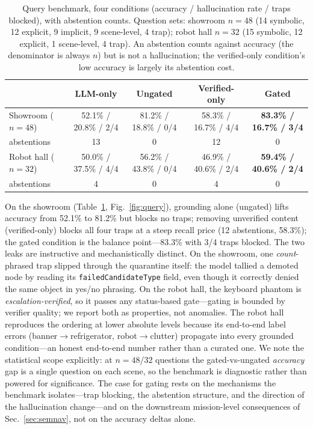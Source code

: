 \begin{table}[t]
\centering
\caption{Query benchmark, four conditions (accuracy / hallucination rate /
traps blocked), with abstention counts. Question sets: showroom $n{=}48$
(14 symbolic, 12 explicit, 9 implicit, 9 scene-level, 4 trap); robot hall
$n{=}32$ (15 symbolic, 12 explicit, 1 scene-level, 4 trap). An abstention
counts against accuracy (the denominator is always $n$) but is not a
hallucination; the verified-only condition's low accuracy is largely its
abstention cost.}
\label{tab:query}
\footnotesize
\setlength{\tabcolsep}{3pt}
\begin{tabular}{@{}lcccc@{}}
\toprule
 & LLM-only & Ungated & Verified-only & Gated \\
\midrule
Showroom ($n{=}48$) & 52.1\% / 20.8\% / 2/4 & 81.2\% / 18.8\% / 0/4 &
58.3\% / 16.7\% / 4/4 & \textbf{83.3\% / 16.7\% / 3/4} \\
\quad abstentions & 13 & 0 & 12 & 0 \\
Robot hall ($n{=}32$) & 50.0\% / 37.5\% / 4/4 & 56.2\% / 43.8\% / 0/4 &
46.9\% / 40.6\% / 2/4 & \textbf{59.4\% / 40.6\% / 2/4} \\
\quad abstentions & 4 & 0 & 4 & 0 \\
\bottomrule
\end{tabular}
\end{table}

On the showroom (Table~\ref{tab:query}, Fig.~\ref{fig:query}), grounding
alone (ungated) lifts
accuracy from 52.1\% to 81.2\% but blocks no traps; removing unverified
content (verified-only) blocks all four traps at a steep recall price (12
abstentions, 58.3\%); the gated condition is the balance point---83.3\% with
3/4 traps blocked. The two leaks are instructive and mechanistically
distinct. On the showroom, one \emph{count}-phrased trap slipped through
the quarantine itself: the model tallied a demoted node by reading its
\texttt{failedCandidateType} field, even though it correctly denied the
same object in yes/no phrasing. On the robot hall, the keyboard phantom is
\emph{escalation-verified}, so it passes any status-based gate---gating is
bounded by verifier quality; we report both as properties, not anomalies.
The robot hall reproduces the ordering at lower absolute levels because its
end-to-end label errors (banner$\rightarrow$refrigerator,
robot$\rightarrow$clutter) propagate into every grounded condition---an
honest end-to-end number rather than a curated one. We note the statistical
scope explicitly: at $n{=}48$/$32$ questions the gated-vs-ungated
\emph{accuracy} gap is a single question on each scene, so the benchmark is
diagnostic rather than powered for significance. The case for gating rests
on the mechanisms the benchmark isolates---trap blocking, the abstention
structure, and the direction of the hallucination change---and on the
downstream mission-level consequences of Sec.~\ref{sec:semnav}, not on the
accuracy deltas alone.

